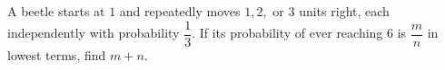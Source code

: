 A beetle starts at $1$ and repeatedly moves $1,2,$ or $3$ units right, each independently with probability $\dfrac{1}{3}$. If its probability of ever reaching $6$ is $\dfrac{m}{n}$ in lowest terms, find $m+n$.
